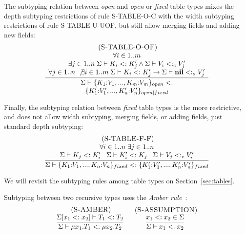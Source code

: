 \documentclass{sigplanconf}
\newcommand{\Nil}{\mathbf{nil}}
\newcommand{\mylabel}[1]{\; (\textsc{#1})}
\newcommand{\senv}{\Sigma}
\newcommand{\subtype}{<:}
\begin{document}
The subtyping relation between {\em open} and {\em open} or
{\em fixed} table types mixes the depth subtyping restrictions of rule {\sc S-TABLE-O-C} with the width subtyping restrictions of
rule {\sc S-TABLE-U-UOF}, but still allow merging fields and
adding new fields:
\[
\begin{array}{c}
\mylabel{S-TABLE-O-OF}\\
\dfrac{\begin{array}{c}
       \forall i \in 1..m \\
       \exists j \in 1..n \;
       \senv \vdash K_{i} \subtype K_{j}' \land \senv \vdash V_{i} \subtype_{c} V_{j}' \\
       \forall j \in 1..n \; \not\exists i \in 1..m \;
       \senv \vdash K_{i} \subtype K_{j}' \to \senv \vdash \Nil \subtype_{o} V_{j}'
       \end{array}}
      {\begin{array}{c}
       \senv \vdash \{K_{1}{:}V_{1}, ..., K_{m}{:}V_{m}\}_{open} \subtype\\
                    \{K_{1}'{:}V_{1}', ..., K_{n}'{:}V_{n}'\}_{open|fixed}
       \end{array}}
\end{array}
\]

Finally, the subtyping relation between {\em fixed} table
types is the more restrictive, and does not allow width
subtyping, merging fields, or adding fields, just standard
depth subtyping:
\[
\begin{array}{c}
\mylabel{S-TABLE-F-F}\\
\dfrac{\begin{array}{c}
       \forall i \in 1..n \; \exists j \in 1..n \\
       \senv \vdash K_{j} \subtype K_{i}' \;\;\;
       \senv \vdash K_{i}' \subtype K_{j} \;\;\;
       \senv \vdash V_{j} \subtype_{c} V_{i}'
       \end{array}}
      {\senv \vdash \{K_{1}{:}V_{1}, ..., K_{n}{:}V_{n}\}_{fixed} \subtype
                    \{K_{1}'{:}V_{1}', ..., K_{n}'{:}V_{n}'\}_{fixed}}
\end{array}
\]

We will revisit the subtyping rules among table types on
Section~\ref{sec:tables}.

Subtyping between two recursive types uses the \emph{Amber rule}~\cite{cardelli1986amber}:
\[
\begin{array}{c}
\begin{array}{c}
\mylabel{S-AMBER}\\
\dfrac{\senv[x_{1} \subtype x_{2}] \vdash T_{1} \subtype T_{2}}
      {\senv \vdash \mu x_{1}.T_{1} \subtype \mu x_{2}.T_{2}}
\end{array}
\;
\begin{array}{c}
\mylabel{S-ASSUMPTION}\\
\dfrac{x_{1} \subtype x_{2} \in \senv}
      {\senv \vdash x_{1} \subtype x_{2}}
\end{array}
\end{array}
\]
\end{document}
